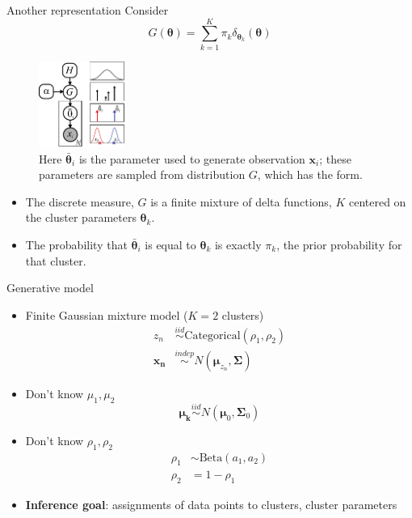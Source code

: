 \documentclass[10pt,mathserif]{beamer}
\begin{document}
\begin{frame}{Another representation}
Consider
\begin{equation*}
        G(\bm{\theta}) = \sum_{k= 1}^K \pi_k\delta_{\bm{\theta}_k} (\bm{\theta})
\end{equation*}
\begin{figure}[h]
\centering
\includegraphics[width=0.25\textwidth]{sudderth-finiteMixDistGraphExampleData}
\caption{Here $\bar{\bm{\theta}}_i$ is the parameter used to generate observation $\bm{x}_i$; these parameters are sampled from distribution $G$, which has the form.}
\end{figure}

\begin{itemize}
    \item The discrete measure, $G$ is a finite mixture of delta functions, $K$ centered on the cluster parameters $\bm{\theta}_k$. 
    \item The probability that $\bar{\bm{\theta}}_i$ is equal to $\bm{\theta}_k$ is exactly $\pi_k$, the prior probability for that cluster.
\end{itemize}    
\end{frame}


\begin{frame}{Generative model}
\begin{itemize}
    \item Finite Gaussian mixture model ($K=2$ clusters)
    \begin{equation*}
        \begin{split}
            z_n & \overset{iid}{\sim} \text{Categorical}(\rho_1,\rho_2)\\
            \bm{x_n} & \overset{indep}{\sim} N(\bm{\mu}_{z_n},\bm{\Sigma})
        \end{split}
    \end{equation*}
    \item Don't know $\mu_1,\mu_2$
    \begin{equation*}
        \bm{\mu_k} \overset{iid}{\sim} N(\bm{\mu}_0,\bm{\Sigma}_0)
    \end{equation*}
    \item Don't know $\rho_1,\rho_2$
    \begin{equation*}
        \begin{split}
            \rho_1 & \sim\text{Beta}(a_1,a_2)\\
            \rho_2 & = 1 - \rho_1
        \end{split}
    \end{equation*}
    \item \textbf{Inference goal}: assignments of data points to clusters, cluster parameters
\end{itemize}    
\end{frame}
\end{document}
